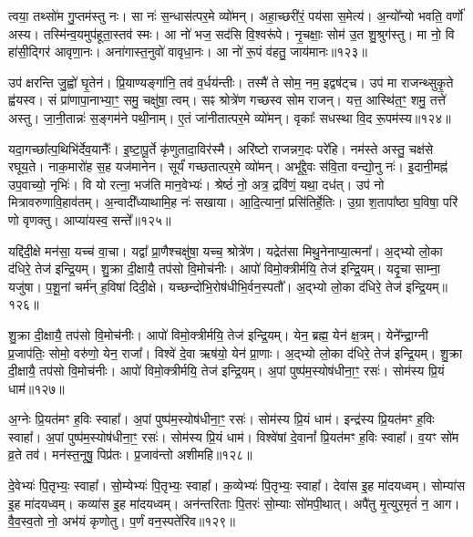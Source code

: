 त्वया॒ तथ्सो॑म गु॒प्तम॑स्तु नः।
सा नः॑ स॒न्धास॑त्पर॒मे व्यो॑मन्।
अहा॒च्छरी॑रं॒ पय॑सा स॒मेत्य॑।
अ॒न्यो᳚न्यो भवति॒ वर्णो॑ अस्य।
तस्मि॑न्व॒यमुप॑हूता॒स्तव॑ स्मः।
आ नो॑ भज॒ सद॑सि वि॒श्वरू॑पे।
नृ॒चक्षाः॒ सोम॑ उ॒त शु॒श्रुग॑स्तु।
मा नो॒ वि हा॑सी॒द्गिर॑ आवृणा॒नः।
अना॑गास्त॒नुवो॑ वावृधा॒नः।
आ नो॑ रू॒पं व॑हतु॒ जाय॑मानः॥१२३॥

उप॑ क्षरन्ति जु॒ह्वो॑ घृ॒तेन॑।
प्रि॒याण्यङ्गा॑नि॒ तव॑ व॒र्धय॑न्तीः।
तस्मै॑ ते सोम॒ नम॒ इद्वष॑ट्च।
उप॑ मा राजन्थ्सुकृ॒ते ह्व॑यस्व।
सं प्रा॑णापा॒नाभ्या॒ꣳ॒ समु॒ चक्षु॑षा॒ त्वम्।
सꣴ श्रोत्रे॑ण गच्छस्व सोम राजन्।
यत्त॒ आस्थि॑त॒ꣳ॒ शमु॒ तत्ते॑ अस्तु।
जा॒नी॒तान्नः॑ स॒ङ्गम॑ने पथी॒नाम्।
ए॒तं जा॑नीतात्पर॒मे व्यो॑मन्।
वृकाः᳚ सधस्था वि॒द रू॒पम॑स्य॥१२४॥

यदा॒गच्छा᳚त्प॒थिभि॑र्देव॒यानैः᳚।
इ॒ष्टा॒पू॒र्ते कृ॑णुतादा॒विर॑स्मै।
अरि॑ष्टो राजन्नग॒दः परे॑हि।
नम॑स्ते अस्तु॒ चक्ष॑से रघूय॒ते।
नाक॒मारो॑ह स॒ह यज॑मानेन।
सूर्यं॑ गच्छतात्पर॒मे व्यो॑मन्।
अभू᳚द्दे॒वः स॑वि॒ता वन्द्यो॒नु नः॑।
इ॒दानी॒मह्न॑ उप॒वाच्यो॒ नृभिः॑।
वि यो रत्ना॒ भज॑ति मान॒वेभ्यः॑।
श्रेष्ठं॑ नो॒ अत्र॒ द्रवि॑णं॒ यथा॒ दध॑त्।
उप॑ नो मित्रावरुणावि॒हाव॑तम्।
अ॒न्वादी᳚ध्याथामि॒ह नः॑ सखाया।
आ॒दि॒त्यानां॒ प्रसि॑तिर्\mbox{}हे॒तिः।
उ॒ग्रा श॒तापा᳚ष्ठा घ॒विषा॒ परि॑ णो वृणक्तु।
आप्या॑यस्व॒ सन्ते᳚॥१२५॥\anuvakamend[त्मना॒ जाय॑मानो\-ऽस्य॒ दध॒त्पञ्च॑ च]

यद्दि॑दी॒क्षे मन॑सा॒ यच्च॑ वा॒चा।
यद्वा᳚ प्रा॒णैश्चक्षु॑षा॒ यच्च॒ श्रोत्रे॑ण।
यद्रेत॑सा मिथु॒नेनाप्या॒त्मना᳚।
अ॒द्भ्यो लो॒का द॑धिरे॒ तेज॑ इन्द्रि॒यम्।
शु॒क्रा दी॒क्षायै॒ तप॑सो वि॒मोच॑नीः।
आपो॑ विमो॒क्त्रीर्मयि॒ तेज॑ इन्द्रि॒यम्।
यदृ॒चा साम्ना॒ यजु॑षा।
प॒शू॒नां चर्म॑न् ह॒विषा॑ दिदी॒क्षे।
यच्छन्दो॑भि॒रोष॑धीभि॒र्वन॒स्पतौ᳚।
अ॒द्भ्यो लो॒का द॑धिरे॒ तेज॑ इन्द्रि॒यम्॥१२६॥

शु॒क्रा दी॒क्षायै॒ तप॑सो वि॒मोच॑नीः।
आपो॑ विमो॒क्त्रीर्मयि॒ तेज॑ इन्द्रि॒यम्।
येन॒ ब्रह्म॒ येन॑ क्ष॒त्रम्।
येने᳚न्द्रा॒ग्नी प्र॒जाप॑तिः॒ सोमो॒ वरु॑णो॒ येन॒ राजा᳚।
विश्वे॑ दे॒वा ऋष॑यो॒ येन॑ प्रा॒णाः।
अ॒द्भ्यो लो॒का द॑धिरे॒ तेज॑ इन्द्रि॒यम्।
शु॒क्रा दी॒क्षायै॒ तप॑सो वि॒मोच॑नीः।
आपो॑ विमो॒क्त्रीर्मयि॒ तेज॑ इन्द्रि॒यम्।
अ॒पां पुष्प॑म॒स्योष॑धीना॒ꣳ॒ रसः॑।
सोम॑स्य प्रि॒यं धाम॑॥१२७॥

अ॒ग्नेः प्रि॒यत॑मꣳ ह॒विः स्वाहा᳚।
अ॒पां पुष्प॑म॒स्योष॑धीना॒ꣳ॒ रसः॑।
सोम॑स्य प्रि॒यं धाम॑।
इन्द्र॑स्य प्रि॒यत॑मꣳ ह॒विः स्वाहा᳚।
अ॒पां पुष्प॑म॒स्योष॑धीना॒ꣳ॒ रसः॑।
सोम॑स्य प्रि॒यं धाम॑।
विश्वे॑षां दे॒वानां᳚ प्रि॒यत॑मꣳ ह॒विः स्वाहा᳚।
व॒यꣳ सो॑म व्र॒ते तव॑।
मन॑स्त॒नूषु॒ पिप्र॑तः।
प्र॒जाव॑न्तो अशीमहि॥१२८॥

दे॒वेभ्यः॑ पि॒तृभ्यः॒ स्वाहा᳚।
सो॒म्येभ्यः॑ पि॒तृभ्यः॒ स्वाहा᳚।
क॒व्येभ्यः॑ पि॒तृभ्यः॒ स्वाहा᳚।
देवा॑स इ॒ह मा॑दयध्वम्।
सोम्या॑स इ॒ह मा॑दयध्वम्।
कव्या॑स इ॒ह मा॑दयध्वम्।
अन॑न्तरिताः पि॒तरः॑ सो॒म्याः सो॑मपी॒थात्।
अपै॑तु मृ॒त्युर॒मृतं॑ न॒ आग\sn{}।
वै॒व॒स्व॒तो नो॒ अभ॑यं कृणोतु।
प॒र्णं वन॒स्पते॑रिव॥१२९॥

